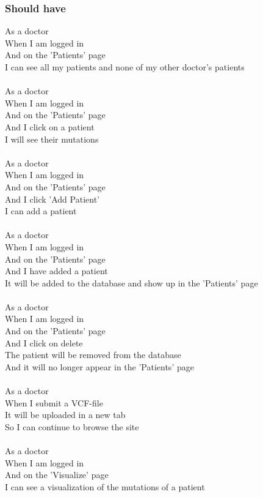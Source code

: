 	\subsubsection*{Should have}
		As a doctor\\
		When I am logged in\\
		And on the 'Patients' page\\
		I can see all my patients and none of my other doctor's patients\\
		\\
		As a doctor\\
		When I am logged in\\
		And on the 'Patients' page\\
		And I click on a patient\\
		I will see their mutations\\
		\\
		As a doctor\\
		When I am logged in\\
		And on the 'Patients' page\\
		And I click 'Add Patient'\\
		I can add a patient\\
		\\
		As a doctor\\
		When I am logged in\\
		And on the 'Patients' page\\
		And I have added a patient\\
		It will be added to the database and show up in the 'Patients' page\\
		\\
		As a doctor\\
		When I am logged in\\
		And on the 'Patients' page\\
		And I click on delete\\
		The patient will be removed from the database\\
		And it will no longer appear in the 'Patients' page\\
		\\
		As a doctor\\
		When I submit a VCF-file\\
		It will be uploaded in a new tab\\
		So I can continue to browse the site\\
		\\
		As a doctor\\
		When I am logged in\\
		And on the 'Visualize' page\\
		I can see a visualization of the mutations of a patient\\

